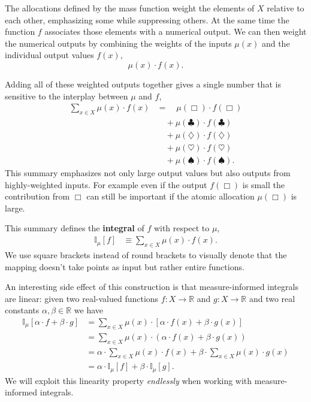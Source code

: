 \documentclass[
  letterpaper,
  DIV=11,
  numbers=noendperiod]{scrartcl}
\begin{document}
The allocations defined by the mass function weight the elements of
\(X\) relative to each other, emphasizing some while suppressing others.
At the same time the function \(f\) associates those elements with a
numerical output. We can then weight the numerical outputs by combining
the weights of the inputs \(\mu(x)\) and the individual output values
\(f(x)\), \[
\mu(x) \cdot f(x).
\]

Adding all of these weighted outputs together gives a single number that
is sensitive to the interplay between \(\mu\) and \(f\), \begin{align*}
\sum_{x \in X} \mu(x) \cdot f(x)
&=
\quad \mu(\Box) \cdot f(\Box)
\\
&\quad
+ \mu(\clubsuit) \cdot f(\clubsuit)
\\
&\quad
+ \mu(\diamondsuit) \cdot f(\diamondsuit)
\\
&\quad
+ \mu(\heartsuit) \cdot f(\heartsuit)
\\
&\quad
+ \mu(\spadesuit) \cdot f(\spadesuit).
\end{align*} This summary emphasizes not only large output values but
also outputs from highly-weighted inputs. For example even if the output
\(f(\Box)\) is small the contribution from \(\Box\) can still be
important if the atomic allocation \(\mu(\Box)\) is large.

This summary defines the \textbf{integral} of \(f\) with respect to
\(\mu\), \begin{align*}
\mathbb{I}_{\mu}[f]
&\equiv \sum_{x \in X} \mu(x) \cdot f(x).
\end{align*} We use square brackets instead of round brackets to
visually denote that the mapping doesn't take points as input but rather
entire functions.

An interesting side effect of this construction is that measure-informed
integrals are linear: given two real-valued functions
\(f: X \rightarrow \mathbb{R}\) and \(g : X \rightarrow \mathbb{R}\) and
two real constants \(\alpha, \beta \in \mathbb{R}\) we have
\begin{align*}
\mathbb{I}_{\mu}[\alpha \cdot f + \beta \cdot g]
&= \sum_{x \in X} \mu(x) \cdot
\left[ \alpha \cdot f(x) + \beta \cdot g(x) \right]
\\
&=  \sum_{x \in X} \mu(x) \cdot
\left( \alpha \cdot f(x) + \beta \cdot g(x) \right)
\\
&=  \alpha \cdot \sum_{x \in X} \mu(x) \cdot f(x)
  + \beta \cdot \sum_{x \in X} \mu(x) \cdot g(x)
\\
&=  \alpha \cdot \mathbb{I}_{\mu}[f]
  + \beta \cdot \mathbb{I}_{\mu}[g].
\end{align*} We will exploit this linearity property \emph{endlessly}
when working with measure-informed integrals.
\end{document}
